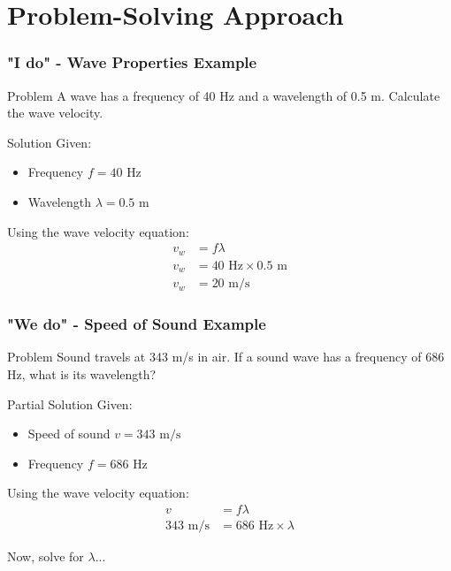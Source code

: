 \documentclass{beamer}
\begin{document}
\section{Problem-Solving Approach}

\begin{frame}
\frametitle{"I do" - Wave Properties Example}
\begin{block}{Problem}
A wave has a frequency of 40 Hz and a wavelength of 0.5 m. Calculate the wave velocity.
\end{block}

\begin{block}{Solution}
Given:
\begin{itemize}
\item Frequency $f = 40 \text{ Hz}$
\item Wavelength $\lambda = 0.5 \text{ m}$
\end{itemize}

Using the wave velocity equation:
\begin{align}
v_w &= f\lambda \\
v_w &= 40 \text{ Hz} \times 0.5 \text{ m} \\
v_w &= 20 \text{ m/s}
\end{align}
\end{block}
\end{frame}

\begin{frame}
\frametitle{"We do" - Speed of Sound Example}
\begin{block}{Problem}
Sound travels at 343 m/s in air. If a sound wave has a frequency of 686 Hz, what is its wavelength?
\end{block}

\begin{block}{Partial Solution}
Given:
\begin{itemize}
\item Speed of sound $v = 343 \text{ m/s}$
\item Frequency $f = 686 \text{ Hz}$
\end{itemize}

Using the wave velocity equation:
\begin{align}
v &= f\lambda \\
343 \text{ m/s} &= 686 \text{ Hz} \times \lambda
\end{align}

Now, solve for $\lambda$...
\end{block}

\end{frame}
\end{document}
